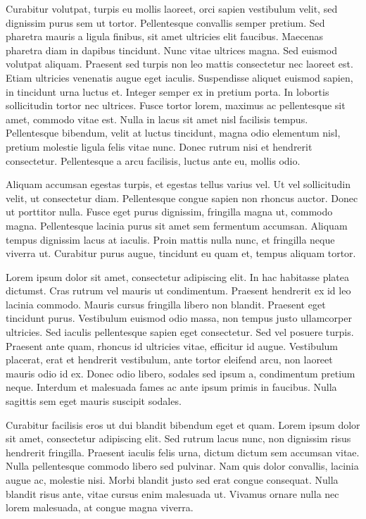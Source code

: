 \documentclass{homework}
\begin{document}
Curabitur volutpat, turpis eu mollis laoreet, orci sapien vestibulum velit, sed dignissim purus sem ut tortor. Pellentesque convallis semper pretium. Sed pharetra mauris a ligula finibus, sit amet ultricies elit faucibus. Maecenas pharetra diam in dapibus tincidunt. Nunc vitae ultrices magna. Sed euismod volutpat aliquam. Praesent sed turpis non leo mattis consectetur nec laoreet est. Etiam ultricies venenatis augue eget iaculis. Suspendisse aliquet euismod sapien, in tincidunt urna luctus et. Integer semper ex in pretium porta. In lobortis sollicitudin tortor nec ultrices. Fusce tortor lorem, maximus ac pellentesque sit amet, commodo vitae est. Nulla in lacus sit amet nisl facilisis tempus. Pellentesque bibendum, velit at luctus tincidunt, magna odio elementum nisl, pretium molestie ligula felis vitae nunc. Donec rutrum nisi et hendrerit consectetur. Pellentesque a arcu facilisis, luctus ante eu, mollis odio.

Aliquam accumsan egestas turpis, et egestas tellus varius vel. Ut vel sollicitudin velit, ut consectetur diam. Pellentesque congue sapien non rhoncus auctor. Donec ut porttitor nulla. Fusce eget purus dignissim, fringilla magna ut, commodo magna. Pellentesque lacinia purus sit amet sem fermentum accumsan. Aliquam tempus dignissim lacus at iaculis. Proin mattis nulla nunc, et fringilla neque viverra ut. Curabitur purus augue, tincidunt eu quam et, tempus aliquam tortor.

Lorem ipsum dolor sit amet, consectetur adipiscing elit. In hac habitasse platea dictumst. Cras rutrum vel mauris ut condimentum. Praesent hendrerit ex id leo lacinia commodo. Mauris cursus fringilla libero non blandit. Praesent eget tincidunt purus. Vestibulum euismod odio massa, non tempus justo ullamcorper ultricies. Sed iaculis pellentesque sapien eget consectetur. Sed vel posuere turpis. Praesent ante quam, rhoncus id ultricies vitae, efficitur id augue. Vestibulum placerat, erat et hendrerit vestibulum, ante tortor eleifend arcu, non laoreet mauris odio id ex. Donec odio libero, sodales sed ipsum a, condimentum pretium neque. Interdum et malesuada fames ac ante ipsum primis in faucibus. Nulla sagittis sem eget mauris suscipit sodales.

Curabitur facilisis eros ut dui blandit bibendum eget et quam. Lorem ipsum dolor sit amet, consectetur adipiscing elit. Sed rutrum lacus nunc, non dignissim risus hendrerit fringilla. Praesent iaculis felis urna, dictum dictum sem accumsan vitae. Nulla pellentesque commodo libero sed pulvinar. Nam quis dolor convallis, lacinia augue ac, molestie nisi. Morbi blandit justo sed erat congue consequat. Nulla blandit risus ante, vitae cursus enim malesuada ut. Vivamus ornare nulla nec lorem malesuada, at congue magna viverra.
\end{document}
